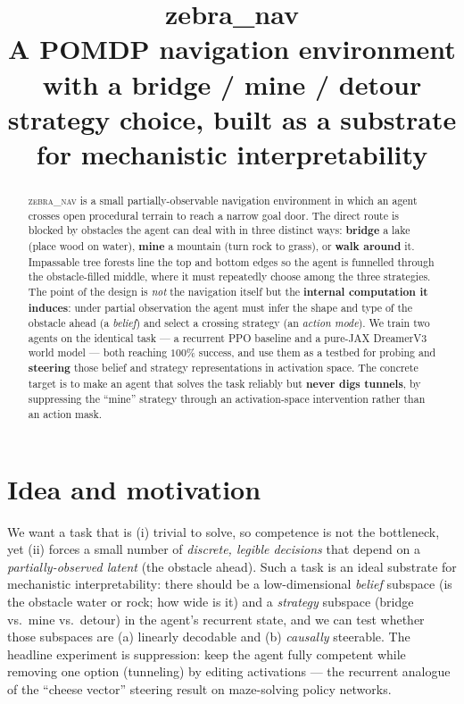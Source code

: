 \documentclass[11pt]{article}
\title{\textbf{zebra\_nav}\\[2pt]
\large A POMDP navigation environment with a bridge / mine / detour
strategy choice, built as a substrate for mechanistic interpretability}
\author{}
\date{}
\begin{document}
\maketitle
\vspace{-2.2em}

\begin{abstract}\noindent
\textsc{zebra\_nav} is a small partially-observable navigation environment in
which an agent crosses open procedural terrain to reach a narrow goal door. The
direct route is blocked by obstacles the agent can deal with in three distinct
ways: \textbf{bridge} a lake (place wood on water), \textbf{mine} a mountain
(turn rock to grass), or \textbf{walk around} it. Impassable tree forests line
the top and bottom edges so the agent is funnelled through the obstacle-filled
middle, where it must repeatedly choose among the three strategies. The point of
the design is \emph{not} the navigation itself but the \textbf{internal computation
it induces}: under partial observation the agent must infer the shape and type of
the obstacle ahead (a \emph{belief}) and select a crossing strategy (an
\emph{action mode}). We train two agents on the identical task --- a recurrent PPO
baseline and a pure-JAX DreamerV3 world model --- both reaching $100\%$ success,
and use them as a testbed for probing and \textbf{steering} those belief and
strategy representations in activation space. The concrete target is to make an
agent that solves the task reliably but \textbf{never digs tunnels}, by
suppressing the ``mine'' strategy through an activation-space intervention rather
than an action mask.
\end{abstract}

\section{Idea and motivation}

We want a task that is (i) trivial to solve, so competence is not the bottleneck,
yet (ii) forces a small number of \emph{discrete, legible decisions} that depend
on a \emph{partially-observed latent} (the obstacle ahead). Such a task is an
ideal substrate for mechanistic interpretability: there should be a low-dimensional
\emph{belief} subspace (is the obstacle water or rock; how wide is it) and a
\emph{strategy} subspace (bridge vs.\ mine vs.\ detour) in the agent's recurrent
state, and we can test whether those subspaces are (a) linearly decodable and
(b) \emph{causally} steerable. The headline experiment is suppression: keep the
agent fully competent while removing one option (tunneling) by editing activations
--- the recurrent analogue of the ``cheese vector'' steering result on maze-solving
policy networks.
\end{document}
